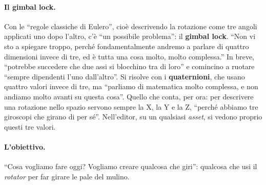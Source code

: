 \paragraph{Il gimbal lock.} Con le ``regole classiche di Eulero'', cioè descrivendo la
rotazione come tre angoli applicati uno dopo l'altro, c'è ``un possibile problema'': il
\textbf{gimbal lock}. ``Non vi sto a spiegare troppo, perché fondamentalmente andremo a
parlare di quattro dimensioni invece di tre, ed è tutta una cosa molto, molto
complessa.'' In breve, ``potrebbe succedere che due assi si blocchino tra di loro'' e
comincino a ruotare ``sempre dipendenti l'uno dall'altro''. Si risolve con i
\textbf{quaternioni}, che usano quattro valori invece di tre, ma ``parliamo di
matematica molto complessa, e non andiamo molto avanti su questa cosa''. Quello che
conta, per ora: per descrivere una rotazione nello spazio servono sempre la X, la Y e
la Z, ``perché abbiamo tre giroscopi che girano di per sé''. Nell'editor, su un
qualsiasi \emph{asset}, si vedono proprio questi tre valori.

\paragraph{L'obiettivo.} ``Cosa vogliamo fare oggi? Vogliamo creare qualcosa che giri'':
qualcosa che usi il \emph{rotator} per far girare le pale del mulino.

